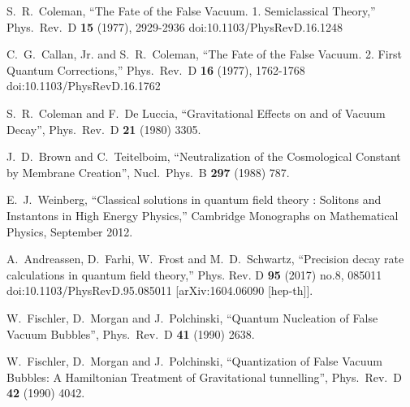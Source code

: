 \documentclass[a4paper,11pt]{article}
\numberwithin{equation}{section}
\begin{document}
 
\begin{thebibliography}{99}

S.~R.~Coleman,
``The Fate of the False Vacuum. 1. Semiclassical Theory,''
Phys.\ Rev.\ D \textbf{15} (1977), 2929-2936
doi:10.1103/PhysRevD.16.1248

C.~G.~Callan, Jr. and S.~R.~Coleman,
``The Fate of the False Vacuum. 2. First Quantum Corrections,''
Phys.\ Rev.\ D \textbf{16} (1977), 1762-1768
doi:10.1103/PhysRevD.16.1762

  S.~R.~Coleman and F.~De Luccia,
  ``Gravitational Effects on and of Vacuum Decay'',
  Phys.\ Rev.\ D {\bf 21} (1980) 3305.
  

  
  J.~D.~Brown and C.~Teitelboim,
  ``Neutralization of the Cosmological Constant by Membrane Creation'',
  Nucl.\ Phys.\ B {\bf 297} (1988) 787.

  E.~J.~Weinberg,
  ``Classical solutions in quantum field theory : Solitons and Instantons in High Energy Physics,''
  Cambridge Monographs on Mathematical Physics,
  September 2012.
  
A.~Andreassen, D.~Farhi, W.~Frost and M.~D.~Schwartz,
``Precision decay rate calculations in quantum field theory,''
Phys. Rev. D \textbf{95} (2017) no.8, 085011
doi:10.1103/PhysRevD.95.085011
[arXiv:1604.06090 [hep-th]].
  
  W.~Fischler, D.~Morgan and J.~Polchinski,
  ``Quantum Nucleation of False Vacuum Bubbles'',
  Phys.\ Rev.\ D {\bf 41} (1990) 2638.

  W.~Fischler, D.~Morgan and J.~Polchinski,
  ``Quantization of False Vacuum Bubbles: A Hamiltonian Treatment of Gravitational tunnelling'',
  Phys.\ Rev.\ D {\bf 42} (1990) 4042.
  

\end{thebibliography}
\end{document}
